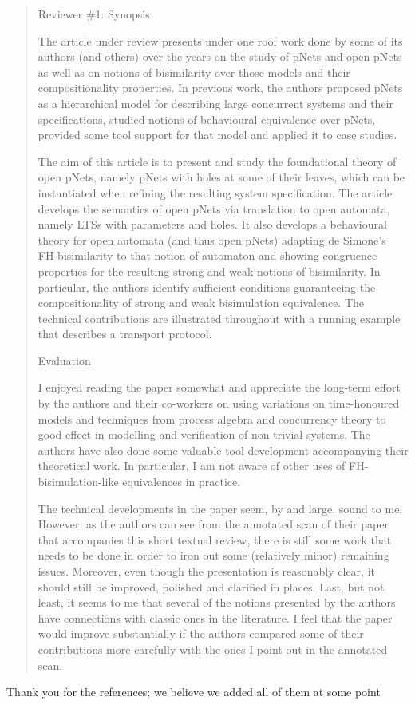 \documentclass[10pt]{article}
\newenvironment{review}{\bgroup\itshape\begin{quote}}{\end{quote}\egroup}
\begin{document}
\begin{review}
Reviewer \#1: Synopsis

The article under review presents under one roof work done by some of its authors (and others) over the years on the study of pNets and open pNets as well as on notions of bisimilarity over those models and their compositionality properties. In previous work, the authors proposed pNets as a hierarchical model for describing large concurrent systems and their specifications, studied notions of behavioural equivalence over pNets, provided some tool support for that model and applied it to case studies.

The aim of this article is to present and study the foundational theory of open pNets, namely pNets with holes at some of their leaves, which can be instantiated when refining the resulting system specification. The article develops the semantics of open pNets via translation to open automata, namely LTSs with parameters and holes. It also develops a behavioural theory for open automata (and thus open pNets) adapting de Simone's FH-bisimilarity to that notion of automaton and showing congruence properties for the resulting strong and weak notions of bisimilarity. In particular, the authors identify sufficient conditions guaranteeing the compositionality of strong and weak bisimulation equivalence. The technical contributions are illustrated throughout with a running example that describes a transport protocol.

Evaluation

I enjoyed reading the paper somewhat and appreciate the long-term effort by the authors and their co-workers on using variations on time-honoured models and techniques from process algebra and concurrency theory to good effect in modelling and verification of non-trivial systems. The authors have also done some valuable tool development accompanying their theoretical work. In particular, I am not aware of other uses of FH-bisimulation-like equivalences in practice.

The technical developments in the paper seem, by and large, sound to me. However, as the authors can see from the annotated scan of their paper that accompanies this short textual review, there is still some work that needs to be done in order to iron out some (relatively minor) remaining issues. Moreover, even though the presentation is reasonably clear, it should still be improved, polished and clarified in places. Last, but not least, it seems to me that several of the notions presented by the authors have connections with classic ones in the literature. I feel that the paper would improve substantially if the authors compared some of their contributions more carefully with the ones I point out in the annotated scan. 
\end{review}
Thank you for the references; we believe we added all of them at some point
\end{document}
